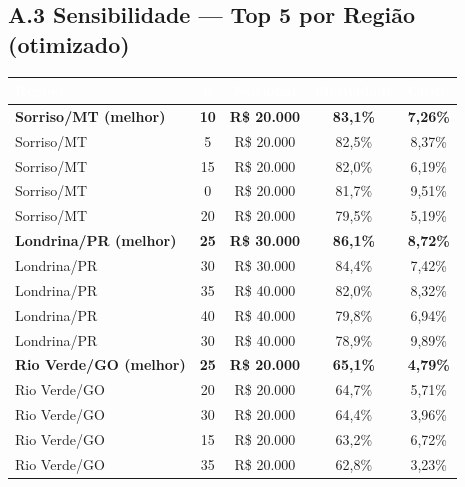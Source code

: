 \documentclass[11pt,a4paper]{article}
\renewcommand{\arraystretch}{1.15}
\begin{document}
\subsection*{A.3 Sensibilidade --- Top 5 por Região (otimizado)}
\smallskip
\renewcommand{\arraystretch}{1.2}
\begin{tabular}{lcccc}
\toprule
\rowcolor{wolf_blue}\textcolor{white}{\textbf{Região}} &
\textcolor{white}{$K$} &
\textcolor{white}{\textbf{Nocional}} &
\textcolor{white}{\textbf{Efetividade}} &
\textcolor{white}{\textbf{Custo}} \\
\midrule
\rowcolor{wolf_lightgreen}\textbf{Sorriso/MT (melhor)} & \textbf{10} & \textbf{R\$ 20.000} & \textbf{83,1\%} & \textbf{7,26\%} \\
Sorriso/MT &  5 & R\$ 20.000 & 82,5\% & 8,37\% \\
Sorriso/MT & 15 & R\$ 20.000 & 82,0\% & 6,19\% \\
Sorriso/MT &  0 & R\$ 20.000 & 81,7\% & 9,51\% \\
Sorriso/MT & 20 & R\$ 20.000 & 79,5\% & 5,19\% \\
\midrule
\rowcolor{wolf_lightgreen}\textbf{Londrina/PR (melhor)} & \textbf{25} & \textbf{R\$ 30.000} & \textbf{86,1\%} & \textbf{8,72\%} \\
Londrina/PR & 30 & R\$ 30.000 & 84,4\% & 7,42\% \\
Londrina/PR & 35 & R\$ 40.000 & 82,0\% & 8,32\% \\
Londrina/PR & 40 & R\$ 40.000 & 79,8\% & 6,94\% \\
Londrina/PR & 30 & R\$ 40.000 & 78,9\% & 9,89\% \\
\midrule
\rowcolor{wolf_lightgreen}\textbf{Rio Verde/GO (melhor)} & \textbf{25} & \textbf{R\$ 20.000} & \textbf{65,1\%} & \textbf{4,79\%} \\
Rio Verde/GO & 20 & R\$ 20.000 & 64,7\% & 5,71\% \\
Rio Verde/GO & 30 & R\$ 20.000 & 64,4\% & 3,96\% \\
Rio Verde/GO & 15 & R\$ 20.000 & 63,2\% & 6,72\% \\
Rio Verde/GO & 35 & R\$ 20.000 & 62,8\% & 3,23\% \\
\bottomrule
\end{tabular}
\end{document}
